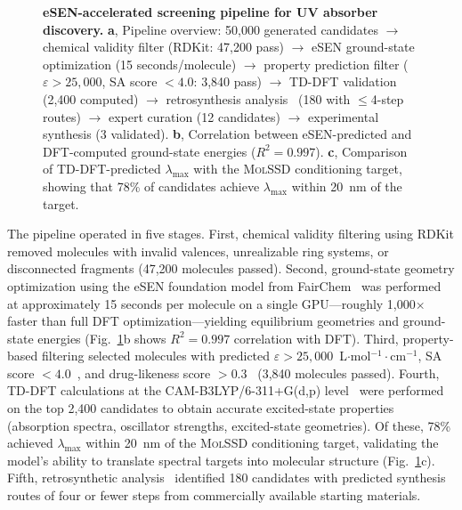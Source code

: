 \documentclass[11pt]{article}
\newcommand{\molssd}{\textsc{MolSSD}}
\begin{document}
\begin{figure}[t]
    \centering
    \caption{\textbf{eSEN-accelerated screening pipeline for UV absorber discovery.} \textbf{a}, Pipeline overview: 50{,}000 generated candidates $\to$ chemical validity filter (RDKit: 47{,}200 pass) $\to$ eSEN ground-state optimization (15 seconds/molecule) $\to$ property prediction filter ($\varepsilon > 25{,}000$, SA score $< 4.0$: 3{,}840 pass) $\to$ TD-DFT validation (2{,}400 computed) $\to$ retrosynthesis analysis~\cite{coley2017retrosynthesis} (180 with $\le$4-step routes) $\to$ expert curation (12 candidates) $\to$ experimental synthesis (3 validated). \textbf{b}, Correlation between eSEN-predicted and DFT-computed ground-state energies ($R^2 = 0.997$). \textbf{c}, Comparison of TD-DFT-predicted $\lambda_{\max}$ with the \molssd{} conditioning target, showing that 78\% of candidates achieve $\lambda_{\max}$ within 20~nm of the target.}
    \label{fig:pipeline}
\end{figure}

The pipeline operated in five stages. First, chemical validity filtering using RDKit removed molecules with invalid valences, unrealizable ring systems, or disconnected fragments (47{,}200 molecules passed). Second, ground-state geometry optimization using the eSEN foundation model from FairChem~\cite{fairchem2024, omol25} was performed at approximately 15 seconds per molecule on a single GPU---roughly 1{,}000$\times$ faster than full DFT optimization---yielding equilibrium geometries and ground-state energies (Fig.~\ref{fig:pipeline}b shows $R^2 = 0.997$ correlation with DFT). Third, property-based filtering selected molecules with predicted $\varepsilon > 25{,}000$~L$\cdot$mol$^{-1}\cdot$cm$^{-1}$, SA score $< 4.0$~\cite{ertl2009sa}, and drug-likeness score $> 0.3$~\cite{bickerton2012qed} (3{,}840 molecules passed). Fourth, TD-DFT calculations at the CAM-B3LYP/6-311+G(d,p) level~\cite{yanai2004camb3lyp} were performed on the top 2{,}400 candidates to obtain accurate excited-state properties (absorption spectra, oscillator strengths, excited-state geometries). Of these, 78\% achieved $\lambda_{\max}$ within 20~nm of the \molssd{} conditioning target, validating the model's ability to translate spectral targets into molecular structure (Fig.~\ref{fig:pipeline}c). Fifth, retrosynthetic analysis~\cite{coley2017retrosynthesis} identified 180 candidates with predicted synthesis routes of four or fewer steps from commercially available starting materials.
\end{document}
